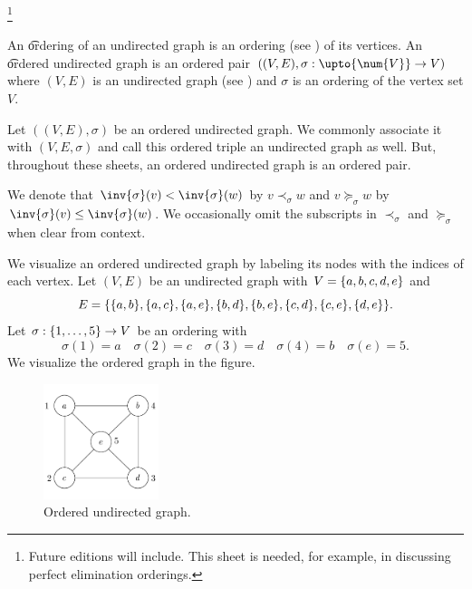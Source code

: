 
  \ifhmode\unskip\fi\footnote{
Future editions will include. This sheet is needed, for example, in discussing perfect elimination orderings.
  }


An \t{ordering} of an undirected graph is an ordering (see ) of its vertices.
An \t{ordered undirected graph} is an ordered pair $((V, E), \sigma : \upto{\num{V}} \to V)$ where $(V, E)$ is an undirected graph (see ) and $\sigma $ is an ordering of the vertex set $V$.


Let $((V, E), \sigma )$ be an ordered undirected graph.
We commonly associate it with $(V, E, \sigma )$ and call this ordered triple an undirected graph as well.
But, throughout these sheets, an ordered undirected graph is an ordered pair.

We denote that $\inv{\sigma }(v) < \inv{\sigma }(w)$ by $v \prec_{\sigma } w$ and $v \succeq_{\sigma } w$ by $\inv{\sigma }(v) \leq \inv{\sigma }(w)$.
We occasionally omit the subscripts in $\prec_{\sigma }$ and $\succeq_{\sigma }$ when clear from context.


We visualize an ordered undirected graph by labeling its nodes with the indices of each vertex.
Let $(V, E)$ be an undirected graph with $V = \{a,b,c,d,e\}$ and
  \[
E = \set*{\set{a, b}, \set{a, c}, \set{a, e}, \set{b, d}, \set{b, e}, \set{c, d}, \set{c, e}, \set{d,e}}.
  \]
Let $\sigma : \{1, \dots , 5\} \to V$ be an ordering with
  \[
\sigma (1) = a \quad \sigma (2) = c \quad \sigma (3) = d \quad \sigma (4) = b \quad \sigma (e) = 5.
  \]
We visualize the ordered graph in the figure.

\begin{figure}
\centering
\includegraphics[width=0.3\textwidth]{graphics_included/ordered_undirected_graph}
\caption{Ordered undirected graph.}
\end{figure}
